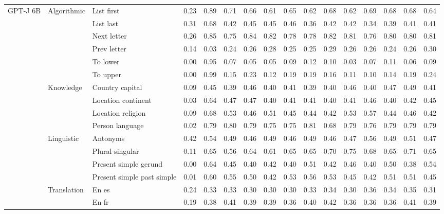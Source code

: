 \begin{center}
\begin{longtable}{lllrrrrrrrrrrrrr}
\multirow[t]{18}{*}{GPT-J 6B} & \multirow[t]{6}{*}{Algorithmic} & List first & 0.23 & 0.89 & 0.71 & 0.66 & 0.61 & 0.65 & 0.62 & 0.68 & 0.62 & 0.69 & 0.68 & 0.68 & 0.64 \\
 &  & List last & 0.31 & 0.68 & 0.42 & 0.45 & 0.45 & 0.46 & 0.36 & 0.42 & 0.42 & 0.34 & 0.39 & 0.41 & 0.41 \\
 &  & Next letter & 0.26 & 0.85 & 0.75 & 0.84 & 0.82 & 0.78 & 0.78 & 0.82 & 0.81 & 0.76 & 0.80 & 0.80 & 0.81 \\
 &  & Prev letter & 0.14 & 0.03 & 0.24 & 0.26 & 0.28 & 0.25 & 0.25 & 0.29 & 0.26 & 0.26 & 0.24 & 0.26 & 0.30 \\
 &  & To lower & 0.00 & 0.95 & 0.07 & 0.05 & 0.05 & 0.09 & 0.12 & 0.10 & 0.03 & 0.07 & 0.11 & 0.06 & 0.09 \\
 &  & To upper & 0.00 & 0.99 & 0.15 & 0.23 & 0.12 & 0.19 & 0.19 & 0.16 & 0.11 & 0.10 & 0.14 & 0.19 & 0.24 \\
\cline{2-16}
 & \multirow[t]{4}{*}{Knowledge} & Country capital & 0.09 & 0.45 & 0.39 & 0.46 & 0.40 & 0.41 & 0.39 & 0.40 & 0.46 & 0.40 & 0.47 & 0.49 & 0.41 \\
 &  & Location continent & 0.03 & 0.64 & 0.47 & 0.47 & 0.40 & 0.41 & 0.41 & 0.40 & 0.41 & 0.46 & 0.40 & 0.42 & 0.45 \\
 &  & Location religion & 0.09 & 0.68 & 0.53 & 0.46 & 0.51 & 0.45 & 0.44 & 0.42 & 0.53 & 0.57 & 0.44 & 0.46 & 0.42 \\
 &  & Person language & 0.02 & 0.79 & 0.80 & 0.79 & 0.75 & 0.75 & 0.81 & 0.68 & 0.79 & 0.76 & 0.79 & 0.79 & 0.79 \\
\cline{2-16}
 & \multirow[t]{4}{*}{Linguistic} & Antonyms & 0.42 & 0.54 & 0.49 & 0.46 & 0.49 & 0.46 & 0.49 & 0.46 & 0.47 & 0.56 & 0.49 & 0.51 & 0.47 \\
 &  & Plural singular & 0.11 & 0.65 & 0.56 & 0.64 & 0.61 & 0.65 & 0.65 & 0.70 & 0.75 & 0.68 & 0.65 & 0.71 & 0.65 \\
 &  & Present simple gerund & 0.00 & 0.64 & 0.45 & 0.40 & 0.42 & 0.40 & 0.51 & 0.42 & 0.46 & 0.40 & 0.50 & 0.38 & 0.54 \\
 &  & Present simple past simple & 0.01 & 0.60 & 0.55 & 0.50 & 0.42 & 0.53 & 0.56 & 0.53 & 0.45 & 0.42 & 0.51 & 0.51 & 0.45 \\
\cline{2-16}
 & \multirow[t]{4}{*}{Translation} & En es & 0.24 & 0.33 & 0.33 & 0.30 & 0.30 & 0.30 & 0.33 & 0.34 & 0.30 & 0.36 & 0.34 & 0.35 & 0.31 \\
 &  & En fr & 0.19 & 0.38 & 0.41 & 0.39 & 0.39 & 0.36 & 0.40 & 0.42 & 0.36 & 0.36 & 0.36 & 0.41 & 0.39 \\

\end{longtable}
\end{center}
